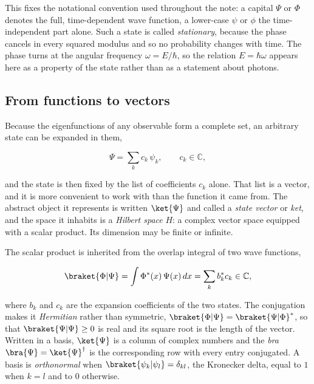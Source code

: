         This fixes the notational convention used throughout the note: a capital $\Psi$ or $\Phi$ denotes the full, time-dependent wave function, a lower-case $\psi$ or $\phi$ the time-independent part alone. Such a state is called \emph{stationary}, because the phase cancels in every squared modulus and so no probability changes with time. The phase turns at the angular frequency $\omega = E/\hbar$, so the relation $E = \hbar\omega$ appears here as a property of the state rather than as a statement about photons.

    \subsection{From functions to vectors}

        Because the eigenfunctions of any observable form a complete set, an arbitrary state can be expanded in them,

        \begin{equation}\label{eq:expansion}
            \Psi = \sum_{k}c_{k}\,\psi_{k}, \qquad c_{k} \in \mathbb{C},
        \end{equation}

        and the state is then fixed by the list of coefficients $c_{k}$ alone. That list is a vector, and it is more convenient to work with than the function it came from. The abstract object it represents is written $\ket{\Psi}$ and called a \emph{state vector} or \emph{ket}, and the space it inhabits is a \emph{Hilbert space} $H$: a complex vector space equipped with a scalar product. Its dimension may be finite or infinite.

        The scalar product is inherited from the overlap integral of two wave functions,

        \begin{equation}\label{eq:inner-product}
            \braket{\Phi|\Psi} = \int \Phi^{*}(x)\,\Psi(x)\,dx = \sum_{k}b_{k}^{*}c_{k} \in \mathbb{C},
        \end{equation}

        where $b_{k}$ and $c_{k}$ are the expansion coefficients of the two states. The conjugation makes it \emph{Hermitian} rather than symmetric, $\braket{\Phi|\Psi} = \braket{\Psi|\Phi}^{*}$, so that $\braket{\Psi|\Psi} \ge 0$ is real and its square root is the length of the vector. Written in a basis, $\ket{\Psi}$ is a column of complex numbers and the \emph{bra} $\bra{\Psi} = \ket{\Psi}^{\dag}$ is the corresponding row with every entry conjugated. A basis is \emph{orthonormal} when $\braket{\psi_{k}|\psi_{l}} = \delta_{kl}$, the Kronecker delta, equal to $1$ when $k=l$ and to $0$ otherwise.

